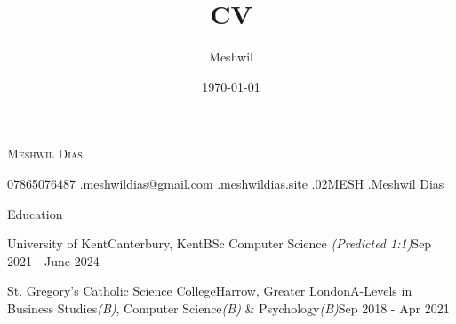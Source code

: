 \documentclass[11pt]{article}
\title{CV}
\author{Meshwil}
\date{\today}
\newlength{\secsep}
\newlength{\seperate}
\newcommand{\coloredhrulefill}[2][black]{%
    \leavevmode%
    \leaders\hbox{\textcolor{#1}{\rule{1ex}{0.5pt}}}\hfill\kern0pt%
}
\newcommand{\name}[1]{\begin{center}\textsc{\Huge#1}\end{center}}
\newcommand{\contactSpace}{\hspace{0.25cm}.\hspace{0.25cm}} %
\newcommand{\contact}[1]{\vspace*{2\secsep}\begin{center}\small#1 \end{center}\vspace*{2\secsep}} %
\newcommand{\lineunder}{\vspace*{-24pt} \hspace*{-6pt} \coloredhrulefill[contactgrey]{}  \\* \vspace*{-15pt}}
\newenvironment{resume_header}{}{\vspace{0pt}}
\newenvironment{tabbedList}[1]{
	\begin{list}{}{
      \setlength{\itemsep}{0pt}
      \setlength{\labelsep}{0pt}
      \setlength{\labelwidth}{0pt}
      \setlength{\leftmargin}{10pt}
      \setlength{\rightmargin}{0pt}
      \setlength{\listparindent}{0pt}
      \setlength{\parsep}{0pt}
      \setlength{\parskip}{0pt}
      \setlength{\partopsep}{0pt}
      \setlength{\topsep}{#1}
	}
	\item[]
}{\end{list}}
\newenvironment{resume_section}[1] {
	\textsc{\Large #1} \\*
	
	\lineunder
	\begin{tabbedList}{\secsep}
}{\end{tabbedList}\vspace{1.2\secsep}}
\newenvironment{resume_subsection}[4] {
	\textbf{#1} \hfill {\footnotesize #2}\vspace*{-1px}\\*  %
	{\small#3} \hfill {\footnotesize \textit{#4}} \hspace{-4px}\vspace*{-8px}
	
	\begin{tabbedList}{0pt}
}{\end{tabbedList}}
\begin{document}
	\begin{resume_header}
		\name{Meshwil Dias}
		\contact{\faPhoneSquare \hspace{\secsep} 07865076487 \contactSpace \href{mailto:meshwildias@gmail.com}{\faSend \hspace{\secsep}meshwildias@gmail.com } \contactSpace \href{https://www.meshwildias.site/}{\faCompass \hspace{\secsep}meshwildias.site} \contactSpace \href{https://github.com/02MESH}{\faGithub \hspace{\secsep}02MESH} \contactSpace \href{https://www.linkedin.com/in/mad-0000/}{\faLinkedinSquare \hspace{\secsep}Meshwil Dias}}
	\end{resume_header}
	
	\vspace*{1.5\seperate}	
	
	\begin{resume_section}{Education}
		\begin{resume_subsection}{University of Kent}{Canterbury, Kent}{BSc Computer Science \textit{(Predicted 1:1)}}{Sep 2021 - June 2024}
		\end{resume_subsection}
		
		
		\begin{resume_subsection}{St. Gregory's Catholic Science College}{Harrow, Greater London}{A-Levels in Business Studies\textit{(B)}, Computer Science\textit{(B)} \& Psychology\textit{(B)}}{Sep 2018 - Apr 2021}
		\end{resume_subsection}
	\end{resume_section}
	
\end{document}
